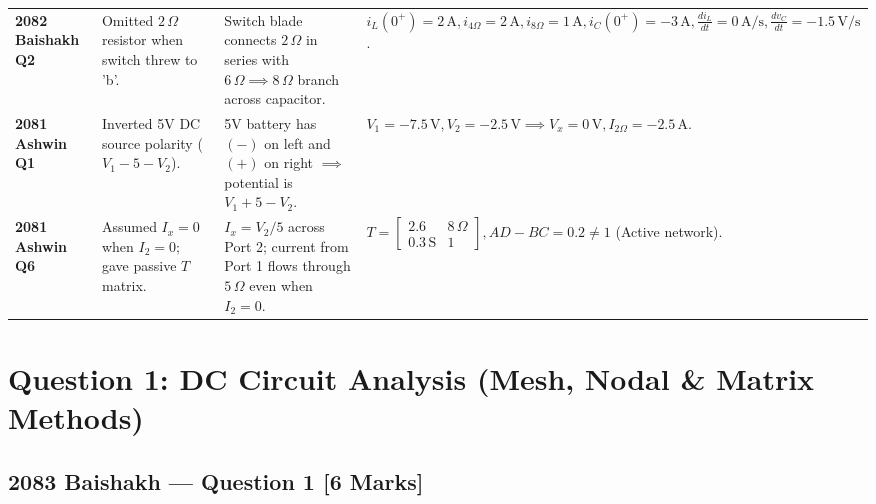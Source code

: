 \documentclass[11pt,a4paper,oneside]{article}
\begin{document}
\begin{center}
\begin{tabular}{@{}lp{4.2cm}p{4.2cm}p{5cm}@{}}
\addlinespace
\textbf{2082 Baishakh Q2} & Omitted $2\,\Omega$ resistor when switch threw to 'b'. & Switch blade connects $2\,\Omega$ in series with $6\,\Omega \implies 8\,\Omega$ branch across capacitor. & $i_L(0^+) = 2\,\mathrm{A}, i_{4\Omega} = 2\,\mathrm{A}, i_{8\Omega} = 1\,\mathrm{A}, i_C(0^+) = -3\,\mathrm{A}, \frac{di_L}{dt} = 0\,\mathrm{A/s}, \frac{dv_C}{dt} = -1.5\,\mathrm{V/s}$. \\
\addlinespace
\textbf{2081 Ashwin Q1} & Inverted 5V DC source polarity ($V_1-5-V_2$). & 5V battery has $(-)$ on left and $(+)$ on right $\implies$ potential is $V_1+5-V_2$. & $V_1 = -7.5\,\mathrm{V}, V_2 = -2.5\,\mathrm{V} \implies V_x = 0\,\mathrm{V}, I_{2\Omega} = -2.5\,\mathrm{A}$. \\
\addlinespace
\textbf{2081 Ashwin Q6} & Assumed $I_x = 0$ when $I_2=0$; gave passive $T$ matrix. & $I_x = V_2/5$ across Port 2; current from Port 1 flows through $5\,\Omega$ even when $I_2=0$. & $T = \begin{bmatrix} 2.6 & 8\,\Omega \\ 0.3\,\mathrm{S} & 1 \end{bmatrix}, AD-BC = 0.2 \ne 1$ (Active network). \\
\bottomrule
\end{tabular}
\end{center}

\newpage

\section{Question 1: DC Circuit Analysis (Mesh, Nodal \& Matrix Methods)}

\subsection{2083 Baishakh --- Question 1 [6 Marks]}
\end{document}
